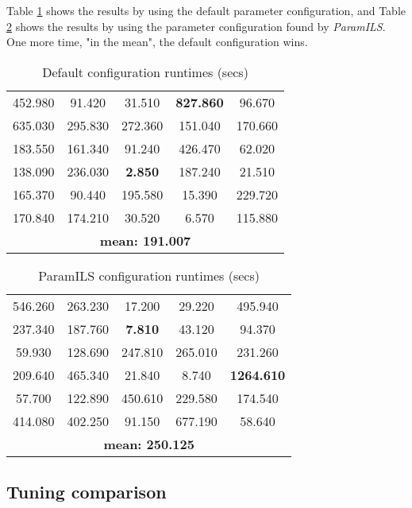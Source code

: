 Table \ref{table:testcabad} shows the results by using the default parameter configuration, and Table \ref{table:testcagood} shows the results by using the parameter configuration found by {\it ParamILS}. One more time, "in the mean", the default configuration wins.

\begin{table}[H]
\caption{Default configuration runtimes (secs)}
\centering
\renewcommand{\arraystretch}{1.2}
\begin{tabular}{|ccccc|}
	\hline
	452.980 & 91.420 & 31.510 & \textcolor{intenso}{\bf 827.860} & 96.670 \\ 
	635.030 & 295.830 & 272.360 & 151.040 & 170.660 \\  
	\hline 
	183.550 & 161.340 & 91.240 & 426.470 & 62.020 \\ 
	138.090 & 236.030 & \textcolor{naranja}{\bf 2.850} & 187.240 & 21.510 \\  
	\hline 
	165.370 & 90.440 & 195.580 & 15.390 & 229.720 \\ 
	170.840 & 174.210 & 30.520 & 6.570 & 115.880 \\  
	\hline
	\multicolumn{5}{|c|}{\bf mean: 191.007}\\
	\hline
\end{tabular}
\label{table:testcabad}
\end{table}

\begin{table}[H]
\caption{ParamILS configuration runtimes (secs)}
\centering
\renewcommand{\arraystretch}{1.2}
\begin{tabular}{|ccccc|}
	\hline
	546.260 & 263.230 & 17.200 & 29.220 & 495.940 \\ 
	237.340 & 187.760 & \textcolor{naranja}{\bf 7.810} & 43.120 & 94.370 \\  
	\hline 
	59.930 & 128.690 & 247.810 & 265.010 & 231.260 \\ 
	209.640 & 465.340 & 21.840 & 8.740 & \textcolor{intenso}{\bf 1264.610} \\  
	\hline 
	57.700 & 122.890 & 450.610 & 229.580 & 174.540 \\ 
	414.080 & 402.250 & 91.150 & 677.190 & 58.640 \\  
	\hline 
	\multicolumn{5}{|c|}{\bf mean: 250.125}\\
	\hline
\end{tabular}
\label{table:testcagood}
\end{table}    

\subsection{Tuning comparison}

